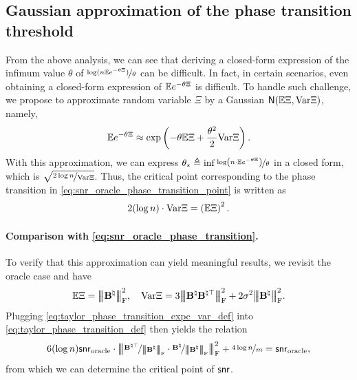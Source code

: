 \documentclass[11pt]{article}
\def \bBtrue {\bB^{\natural}}
\begin{document}
\subsection{Gaussian approximation of the phase transition threshold}
\label{subsec:gauss_approx_oracle}
From the above analysis, we can see that deriving
a closed-form expression of the infimum value
$\theta$ of $\nicefrac{\log(n\mathbb{E} e^{-\theta \Xi})}{\theta}$ can be   difficult. In fact, in certain scenarios, even obtaining a
closed-form expression of $\mathbb{E} e^{-\theta \Xi}$
is difficult.
To handle such challenge, we propose to approximate
random variable $\Xi$ by a Gaussian  $\mathsf{N}(\mathbb{E} \Xi, \textup{Var} \Xi)$,
namely,
\begin{align}\label{eq:taylor_approx}
\mathbb{E} e^{-\theta \Xi} \approx
\exp\left(-\theta \mathbb{E} \Xi +
\frac{\theta^2}{2}\textup{Var}\Xi\right).
\end{align}
With this approximation, we can express
$\theta_* \triangleq \inf \nicefrac{\log\left(n\cdot \mathbb{E} e^{-\theta \Xi}\right)}{\theta}$ in a closed form, which is
$\sqrt{\nicefrac{2\log n}{\textup{Var}\Xi}}$. Thus, the critical
point corresponding to the phase transition in \eqref{eq:snr_oracle_phase_transition_point} is written as
\begin{align}
\label{eq:taylor_phase_transition_def}
2(\log n)\cdot \textup{Var}\Xi = \left(\mathbb{E} \Xi\right)^2.
\end{align}
\paragraph{Comparison with \eqref{eq:snr_oracle_phase_transition}.} To verify that this approximation can yield meaningful results,
we revisit the oracle case and have
\begin{align}
\label{eq:taylor_phase_transition_expc_var_def}
\Expc \Xi =  \Fnorm{\bB^{\natural}}^2, ~~~\Var \Xi = 3\Fnorm{\bB^{\natural}\bB^{\natural \rmt}}^2
+ 2\sigma^2 \Fnorm{\bB^{\natural}}^2.
\end{align}
Plugging \eqref{eq:taylor_phase_transition_expc_var_def}
into \eqref{eq:taylor_phase_transition_def}
then yields the relation
\begin{align}
\label{eq:snr_oracle_phase_transition_approx}
6(\log n) \snr_{\textup{oracle}}\cdot
\Fnorm{\nfrac{\bB^{\natural\rmt}}{\Fnorm{\bBtrue}}\cdot  \nfrac{\bBtrue}{\Fnorm{\bBtrue}}}^2
+ \nfrac{4 \log n}{m}
= \snr_{\textup{oracle}},
\end{align}
from which we can determine the critical
point of $\mathsf{snr}$.
\end{document}
